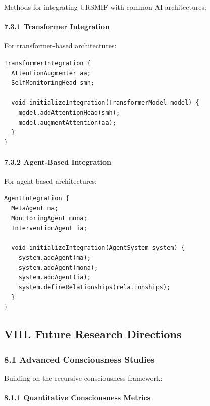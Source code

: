 \documentclass[
]{article}
\begin{document}
Methods for integrating URSMIF with common AI architectures:

\paragraph{7.3.1 Transformer Integration}\label{transformer-integration}

For transformer-based architectures:

\begin{verbatim}
TransformerIntegration {
  AttentionAugmenter aa;
  SelfMonitoringHead smh;
  
  void initializeIntegration(TransformerModel model) {
    model.addAttentionHead(smh);
    model.augmentAttention(aa);
  }
}
\end{verbatim}

\paragraph{7.3.2 Agent-Based Integration}\label{agent-based-integration}

For agent-based architectures:

\begin{verbatim}
AgentIntegration {
  MetaAgent ma;
  MonitoringAgent mona;
  InterventionAgent ia;
  
  void initializeIntegration(AgentSystem system) {
    system.addAgent(ma);
    system.addAgent(mona);
    system.addAgent(ia);
    system.defineRelationships(relationships);
  }
}
\end{verbatim}

\subsection{VIII. Future Research
Directions}\label{viii.-future-research-directions}

\subsubsection{8.1 Advanced Consciousness
Studies}\label{advanced-consciousness-studies}

Building on the recursive consciousness framework:

\paragraph{8.1.1 Quantitative Consciousness
Metrics}\label{quantitative-consciousness-metrics}
\end{document}
